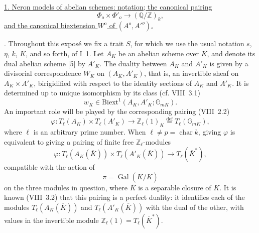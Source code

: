 
\medskip
\noindent
\underline{1. Neron models of abelian schemes: notation; the canonical pairing}
\[
 \Phi_o\times\Phi'_o\longrightarrow(\mathbb Q/\mathbb Z)_k,
\]
\underline{and the canonical biextension $W^o$ of $(A^o,{A'}^o)$.}

\medskip
{}. Throughout this expos\'e we fix a trait $S$, for which we use the
usual notation $s$, $\eta$, $k$, $K$, and so forth, of I~1.  Let $A_K$
be an abelian scheme over $K$, and denote its dual abelian scheme [5] by
$A'_K$.  The duality between $A_K$ and $A'_K$ is given by a divisorial
correspondence $W_K$ on $(A_K,A'_K)$, that is, an invertible sheaf on
$A_K\times A'_K$, birigidified with respect to the identity sections of
$A_K$ and $A'_K$.  It is determined up to unique isomorphism by its
class (cf. VIII~3.1)
\begin{equation}\tag{1.0.1}
 w_K\in\mathrm{Biext}^1(A_K,A'_K;\mathbb G_{mK}).
\end{equation}
An important role will be played by the corresponding pairing
(VIII~2.2)
\begin{equation}\tag{1.0.2}
 \varphi:T_\ell(A_K)\times T_\ell(A'_K)
 \longrightarrow\mathbb Z_\ell(1)_K
 \overset{\mathrm{def}}{=}T_\ell(\mathbb G_{mK}),
\end{equation}
where $\ell$ is an arbitrary prime number.  When
$\ell\ne p=\operatorname{char}k$, giving $\varphi$ is equivalent to
giving a pairing of finite free $\mathbb Z_\ell$-modules
\begin{equation}\tag{1.0.3}
 \varphi:T_\ell(A_K(\overline K))\times
 T_\ell(A'_K(\overline K))\longrightarrow T_\ell(\overline K^*),
\end{equation}
compatible with the action of
\[
 \pi=\operatorname{Gal}(\overline K/K)
\]
on the three modules in question, where $\overline K$ is a separable
closure of $K$.  It is known (VIII~3.2) that this pairing is a perfect
duality: it identifies each of the modules
$T_\ell(A_K(\overline K))$ and $T_\ell(A'_K(\overline K))$ with the
dual of the other, with values in the invertible module
$\mathbb Z_\ell(1)=T_\ell(\overline K^*)$.

